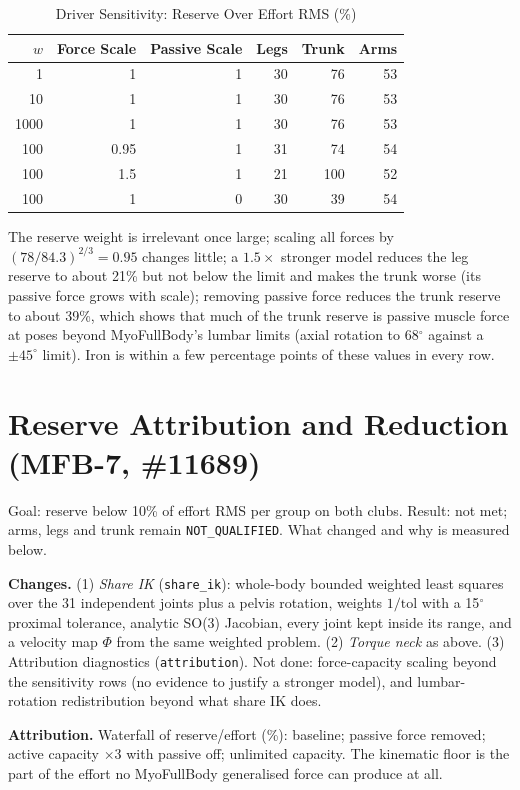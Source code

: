 \documentclass[11pt,a4paper]{article}
\begin{document}
\begin{table}[h]\centering\small
\caption{Driver Sensitivity: Reserve Over Effort RMS (\%)}
\begin{tabular}{rrrrrr}\toprule $w$ & Force Scale & Passive Scale & Legs & Trunk & Arms \\\midrule
1 & 1 & 1 & 30 & 76 & 53 \\
10 & 1 & 1 & 30 & 76 & 53 \\
1000 & 1 & 1 & 30 & 76 & 53 \\
100 & 0.95 & 1 & 31 & 74 & 54 \\
100 & 1.5 & 1 & 21 & 100 & 52 \\
100 & 1 & 0 & 30 & 39 & 54 \\
\bottomrule\end{tabular}\end{table}
\noindent The reserve weight is irrelevant once large; scaling all forces by $(78/84.3)^{2/3}=0.95$ changes little; a $1.5\times$ stronger model reduces the leg reserve to about 21\% but not below the limit and makes the trunk worse (its passive force grows with scale); removing passive force reduces the trunk reserve to about 39\%, which shows that much of the trunk reserve is passive muscle force at poses beyond MyoFullBody's lumbar limits (axial rotation to 68$^\circ$ against a $\pm45^\circ$ limit). Iron is within a few percentage points of these values in every row.

\section{Reserve Attribution and Reduction (MFB-7, \#11689)}
Goal: reserve below 10\% of effort RMS per group on both clubs. Result: not met; arms, legs and trunk remain \texttt{NOT\_QUALIFIED}. What changed and why is measured below.

\textbf{Changes.} (1) \emph{Share IK} (\texttt{share\_ik}): whole-body bounded weighted least squares over the 31 independent joints plus a pelvis rotation, weights $1/\mathrm{tol}$ with a 15$^\circ$ proximal tolerance, analytic SO(3) Jacobian, every joint kept inside its range, and a velocity map $\Phi$ from the same weighted problem. (2) \emph{Torque neck} as above. (3) Attribution diagnostics (\texttt{attribution}). Not done: force-capacity scaling beyond the sensitivity rows (no evidence to justify a stronger model), and lumbar-rotation redistribution beyond what share IK does.

\textbf{Attribution.} Waterfall of reserve/effort (\%): baseline; passive force removed; active capacity $\times3$ with passive off; unlimited capacity. The kinematic floor is the part of the effort no MyoFullBody generalised force can produce at all.
\end{document}
